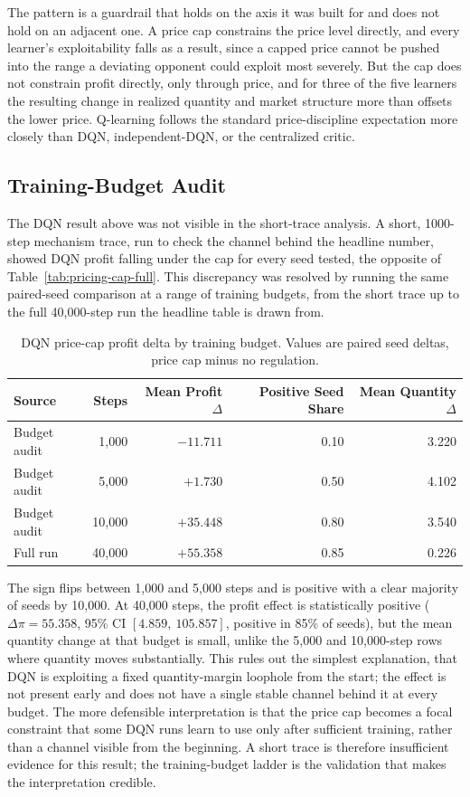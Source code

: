 \documentclass[11pt]{article}
\begin{document}
The pattern is a guardrail that holds on the axis it was built for and does not
hold on an adjacent one. A price cap constrains the price level directly, and
every learner's exploitability falls as a result, since a capped price cannot
be pushed into the range a deviating opponent could exploit most severely. But
the cap does not constrain profit directly, only through price, and for three
of the five learners the resulting change in realized quantity and market
structure more than offsets the lower price. Q-learning follows the standard
price-discipline expectation more closely than DQN, independent-DQN, or the
centralized critic.

\subsection{Training-Budget Audit}

The DQN result above was not visible in the short-trace analysis. A
short, 1000-step mechanism trace, run to check the channel behind the headline
number, showed DQN profit falling under the cap for every seed tested, the
opposite of Table~\ref{tab:pricing-cap-full}. This discrepancy was resolved by
running the same paired-seed comparison at a range of training budgets, from
the short trace up to the full 40,000-step run the headline table is drawn
from.

\begin{table}[h]
\centering
\begin{tabular}{lrrrr}
\toprule
Source & Steps & Mean Profit \(\Delta\) & Positive Seed Share & Mean Quantity \(\Delta\) \\
\midrule
Budget audit & 1{,}000 & \(-11.711\) & 0.10 & 3.220 \\
Budget audit & 5{,}000 & \(+1.730\) & 0.50 & 4.102 \\
Budget audit & 10{,}000 & \(+35.448\) & 0.80 & 3.540 \\
Full run & 40{,}000 & \(+55.358\) & 0.85 & 0.226 \\
\bottomrule
\end{tabular}
\caption{DQN price-cap profit delta by training budget. Values are paired seed
deltas, price cap minus no regulation.}
\label{tab:pricing-budget-ladder}
\end{table}

The sign flips between 1,000 and 5,000 steps and is positive with a clear
majority of seeds by 10,000. At 40,000 steps, the profit effect is
statistically positive (\(\Delta\pi = 55.358\), 95\% CI
\([4.859,\ 105.857]\), positive in 85\% of seeds), but the mean quantity
change at that budget is small, unlike the 5,000 and 10,000-step rows where
quantity moves substantially. This rules out the simplest explanation, that
DQN is exploiting a fixed quantity-margin loophole from the start; the effect
is not present early and does not have a single stable channel behind it at
every budget. The more defensible interpretation is that the price cap becomes
a focal constraint that some DQN runs learn to use only after sufficient
training, rather than a channel visible from the beginning. A short trace is
therefore insufficient evidence for this result; the training-budget ladder is
the validation that makes the interpretation credible.
\end{document}
